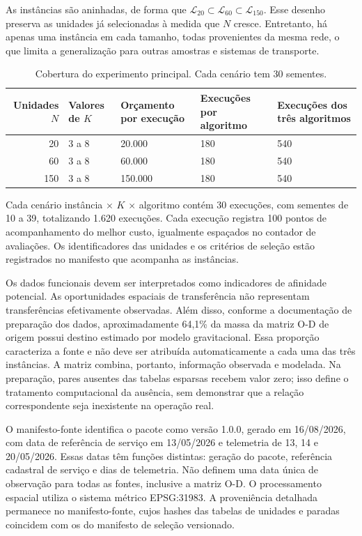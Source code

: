 \documentclass[12pt,a4paper]{article}
\begin{document}
As instâncias são aninhadas, de forma que \(\mathcal L_{20}\subset\mathcal
L_{60}\subset\mathcal L_{150}\). Esse desenho preserva as unidades já selecionadas à
medida que $N$ cresce. Entretanto, há apenas uma instância em cada tamanho, todas
provenientes da mesma rede, o que limita a generalização para outras amostras e sistemas
de transporte.

\begin{table}[htbp]
\centering\small
\caption{Cobertura do experimento principal. Cada cenário tem 30 sementes.}
\label{tab:instancias}
\begin{tabularx}{\textwidth}{rYYYY}
\toprule
Unidades $N$ & Valores de $K$ & Orçamento por execução & Execuções por algoritmo & Execuções dos três algoritmos \\
 & 3 a 8 & 20.000 & 180 & 540 \\
60 & 3 a 8 & 60.000 & 180 & 540 \\
150 & 3 a 8 & 150.000 & 180 & 540 \\
\bottomrule
\end{tabularx}
\end{table}

Cada cenário instância $\times$ $K$ $\times$ algoritmo contém 30 execuções, com sementes
de 10 a 39, totalizando 1.620 execuções. Cada execução registra 100 pontos de
acompanhamento do melhor custo, igualmente espaçados no contador de avaliações. Os
identificadores das unidades e os critérios de seleção estão registrados no manifesto
que acompanha as instâncias.

Os dados funcionais devem ser interpretados como indicadores de afinidade potencial. As
oportunidades espaciais de transferência não representam transferências efetivamente
observadas. Além disso, conforme a documentação de preparação dos dados, aproximadamente
64,1\% da massa da matriz O-D de origem possui destino estimado por modelo
gravitacional. Essa proporção caracteriza a fonte e não deve ser atribuída
automaticamente a cada uma das três instâncias. A matriz combina, portanto, informação
observada e modelada. Na preparação, pares ausentes das tabelas esparsas recebem valor
zero; isso define o tratamento computacional da ausência, sem demonstrar que a relação
correspondente seja inexistente na operação real.

O manifesto-fonte identifica o pacote como versão 1.0.0, gerado em 16/08/2026, com data
de referência de serviço em 13/05/2026 e telemetria de 13, 14 e 20/05/2026. Essas datas
têm funções distintas: geração do pacote, referência cadastral de serviço e dias de
telemetria. Não definem uma data única de observação para todas as fontes, inclusive a
matriz O-D. O processamento espacial utiliza o sistema métrico EPSG:31983. A
proveniência detalhada permanece no manifesto-fonte, cujos hashes das tabelas de
unidades e paradas coincidem com os do manifesto de seleção versionado.
\end{document}
